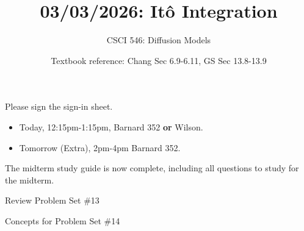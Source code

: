 \documentclass[10pt]{beamer}
\begin{document}




\title{03/03/2026: It\^{o} Integration}
\author{CSCI 546: Diffusion Models}
\date{Textbook reference: Chang Sec 6.9-6.11, GS Sec  13.8-13.9}

\begin{frame}
    \titlepage 
\end{frame}

\begin{frame}

\begin{mygreenbox}[title=Announcement (Sign-in Sheet)]
Please sign the sign-in sheet.
\end{mygreenbox}

\vfill 


\begin{myredbox}[title=Announcement (Office Hours Before Midterm)]
\begin{itemize}
\item Today, 12:15pm-1:15pm, Barnard 352 \textbf{or} Wilson.
\item Tomorrow (Extra), 2pm-4pm Barnard 352. 	
\end{itemize}

\end{myredbox}

\vfill 

\begin{myyellowbox}[title=Midterm Study Guide]
The midterm study guide is now complete, including all questions to study for the midterm.
\end{myyellowbox}
	
\end{frame}

\begin{frame}[standout]
Review Problem Set \#13
\end{frame}

\begin{frame}[standout]
Concepts for Problem Set \#14
\end{frame}


%
\end{document}
